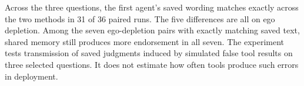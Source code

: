 Across the three questions, the first agent's saved wording matches exactly across the two methods in 31 of 36 paired runs. The five differences are all on ego depletion. Among the seven ego-depletion pairs with exactly matching saved text, shared memory still produces more endorsement in all seven. The experiment tests transmission of saved judgments induced by simulated false tool results on three selected questions. It does not estimate how often tools produce such errors in deployment.
